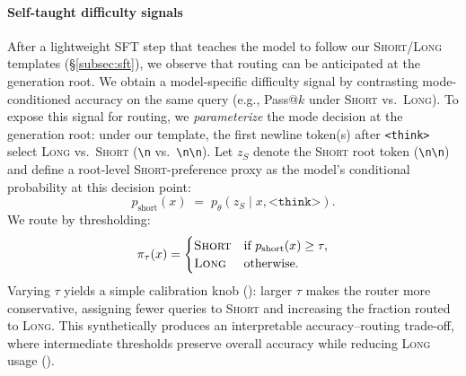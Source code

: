 \paragraph{Self-taught difficulty signals}
After a lightweight SFT step that teaches the model to follow our \textsc{Short}/\textsc{Long} templates (\S\ref{subsec:sft}), we observe that routing can be anticipated at the generation root.
We obtain a model-specific difficulty signal by contrasting mode-conditioned accuracy on the same query (e.g., Pass@$k$ under \textsc{Short} vs.\ \textsc{Long}).
To expose this signal for routing, we \emph{parameterize} the mode decision at the generation root: under our template, the first newline token(s) after \texttt{<think>} select \textsc{Long} vs.\ \textsc{Short} (\texttt{\textbackslash n} vs.\ \texttt{\textbackslash n\textbackslash n}).
Let $z_S$ denote the \textsc{Short} root token (\texttt{\textbackslash n\textbackslash n}) and define a root-level \textsc{Short}-preference proxy as the model's conditional probability at this decision point:
\[
p_{\mathrm{short}}(x)\;=\;p_\theta\!\left(z_S \mid x,\texttt{<think>}\right).
\]
We route by thresholding:
\[
\pi_\tau(x)=
\begin{cases}
\textsc{Short} & \text{if } p_{\mathrm{short}}(x)\ge \tau,\\
\textsc{Long}  & \text{otherwise}.
\end{cases}
\]
Varying $\tau$ yields a simple calibration knob (): larger $\tau$ makes the router more conservative, assigning fewer queries to \textsc{Short} and increasing the fraction routed to \textsc{Long}.
This synthetically produces an interpretable accuracy--routing trade-off, where intermediate thresholds preserve overall accuracy while reducing \textsc{Long} usage ().

\begin{table}[t]
\centering
\small
{}
\caption{Accuracy (\%) and routed instance counts (in parentheses) under threshold routing over MATH500 dataset~\cite{hendrycks2021measuring} with R1-1.5B model.}
\label{tab:motivation-threshold}
\end{table}

